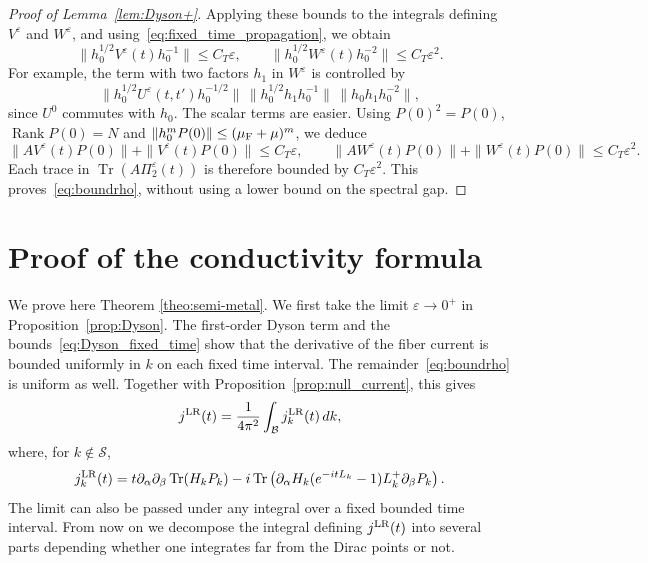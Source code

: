 \documentclass[a4paper,11pt]{article}
\theoremstyle{plain}
\theoremstyle{remark}
\def\eps{{\varepsilon}}
\begin{document}
\begin{proof}[Proof of Lemma~\ref{lem:Dyson+}]
Applying these bounds to the integrals defining $V^\eps$ and $W^\eps$,
and using~\eqref{eq:fixed_time_propagation}, we obtain
\begin{equation}\label{eq:Dyson_fixed_time}
\|h_0^{1/2}V^\eps(t)h_0^{-1}\|\le C_T\eps,
\qquad
\|h_0^{1/2}W^\eps(t)h_0^{-2}\|\le C_T\eps^2.
\end{equation}
For example, the term with two factors $h_1$ in $W^\eps$ is controlled by
\[
\|h_0^{1/2}U^\eps(t,t')h_0^{-1/2}\|
\,\|h_0^{1/2}h_1h_0^{-1}\|
\,\|h_0h_1h_0^{-2}\|,
\]
since $U^0$ commutes with $h_0$. The scalar terms are easier.
Using $P(0)^2=P(0)$, $\operatorname{Rank}P(0)=N$ and
$\|h_0^mP(0)\|\le(\mu_{\rm F}+\mu)^m$, we deduce
\[
\|AV^\eps(t)P(0)\|+\|V^\eps(t)P(0)\|\le C_T\eps,
\qquad
\|AW^\eps(t)P(0)\|+\|W^\eps(t)P(0)\|\le C_T\eps^2.
\]
Each trace in $\operatorname{Tr}(A\Pi_2^\eps(t))$ is therefore bounded
by $C_T\eps^2$. This proves~\eqref{eq:boundrho}, without using a lower
bound on the spectral gap.
\end{proof}


\section{Proof of the conductivity formula}\label{sec:semimet}

We prove here Theorem \ref{theo:semi-metal}. We first take the limit
$\eps\to0^+$ in Proposition~\ref{prop:Dyson}. The first-order Dyson
term and the bounds~\eqref{eq:Dyson_fixed_time} show that the derivative
of the fiber current is bounded uniformly in $k$ on each fixed time
interval. The remainder~\eqref{eq:boundrho} is uniform as well.
Together with Proposition~\ref{prop:null_current}, this gives
\begin{equation}\label{eq:linear_response_current}
j^{\rm LR}(t)=\frac1{4\pi^2}\int_{\mathcal B}j_k^{\rm LR}(t)\,dk,
\end{equation}
where, for $k\notin\mathcal S$,
\begin{equation}\label{eq:linear_response_fiber}
j_k^{\rm LR}(t)=t\partial_\alpha\partial_\beta\Tr(H_kP_k)
-i\Tr\left(\partial_\alpha H_k(e^{-itL_k}-1)L_k^+\partial_\beta P_k\right).
\end{equation}
The limit can also be passed under any integral over a fixed bounded
time interval. From now on we decompose the integral defining
$j^{\rm LR}(t)$ into several parts depending whether one integrates
far from the Dirac points or not.

\medskip
\end{document}
